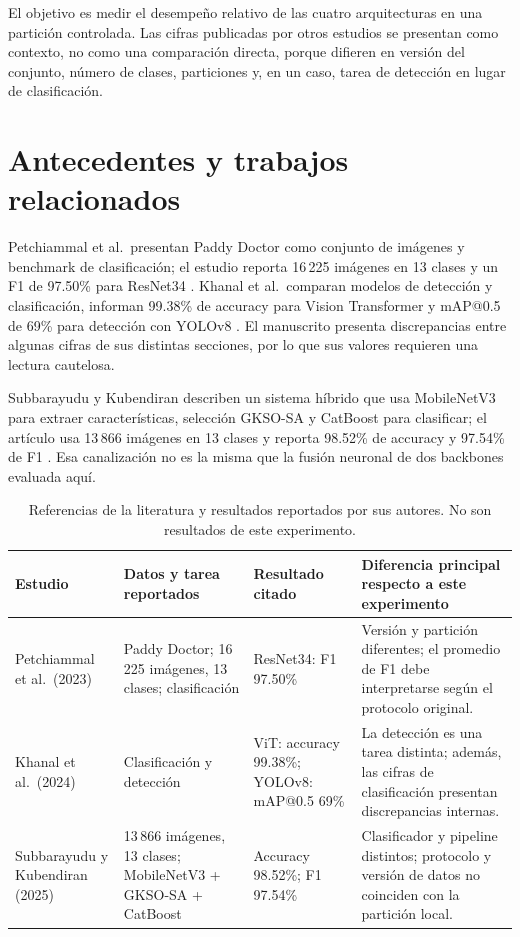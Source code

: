 \documentclass[11pt,a4paper]{article}
\begin{document}
El objetivo es medir el desempeño relativo de las cuatro arquitecturas en una partición controlada. Las cifras publicadas por otros estudios se presentan como contexto, no como una comparación directa, porque difieren en versión del conjunto, número de clases, particiones y, en un caso, tarea de detección en lugar de clasificación.

\section{Antecedentes y trabajos relacionados}
Petchiammal et al.\ presentan Paddy Doctor como conjunto de imágenes y benchmark de clasificación; el estudio reporta 16\,225 imágenes en 13 clases y un F1 de 97.50\% para ResNet34 \cite{petchiammal2023}. Khanal et al.\ comparan modelos de detección y clasificación, informan 99.38\% de accuracy para Vision Transformer y mAP@0.5 de 69\% para detección con YOLOv8 \cite{khanal2024}. El manuscrito presenta discrepancias entre algunas cifras de sus distintas secciones, por lo que sus valores requieren una lectura cautelosa.

Subbarayudu y Kubendiran describen un sistema híbrido que usa MobileNetV3 para extraer características, selección GKSO-SA y CatBoost para clasificar; el artículo usa 13\,866 imágenes en 13 clases y reporta 98.52\% de accuracy y 97.54\% de F1 \cite{subbarayudu2025}. Esa canalización no es la misma que la fusión neuronal de dos backbones evaluada aquí.

\begin{table}[ht]
\centering
\small
\caption{Referencias de la literatura y resultados reportados por sus autores. No son resultados de este experimento.}
\begin{tabularx}{\textwidth}{p{2.8cm}p{3.4cm}p{2.5cm}Y}
\toprule
Estudio & Datos y tarea reportados & Resultado citado & Diferencia principal respecto a este experimento \\
\midrule
Petchiammal et al.\ (2023) & Paddy Doctor; 16\,225 imágenes, 13 clases; clasificación & ResNet34: F1 97.50\% & Versión y partición diferentes; el promedio de F1 debe interpretarse según el protocolo original. \\
Khanal et al.\ (2024) & Clasificación y detección & ViT: accuracy 99.38\%; YOLOv8: mAP@0.5 69\% & La detección es una tarea distinta; además, las cifras de clasificación presentan discrepancias internas. \\
Subbarayudu y Kubendiran (2025) & 13\,866 imágenes, 13 clases; MobileNetV3 + GKSO-SA + CatBoost & Accuracy 98.52\%; F1 97.54\% & Clasificador y pipeline distintos; protocolo y versión de datos no coinciden con la partición local. \\
\bottomrule
\end{tabularx}
\end{table}
\end{document}
